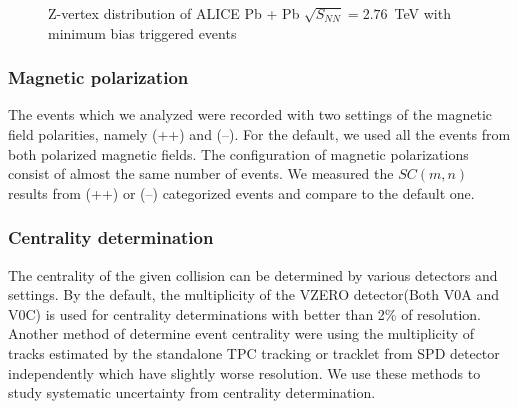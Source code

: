  	\begin{figure}[h]
		\begin{center}
        \caption{Z-vertex distribution of ALICE Pb + Pb $\sqrt{S_{NN}} = 2.76$~TeV with minimum bias triggered events }
        \label{fig:zvtx}
        \end{center}   
     \end{figure}


	
\subsubsection{Magnetic polarization}
	The events which we analyzed were recorded with two settings of the magnetic field polarities, namely (++) and  (--). For the default, we used all the events from both polarized magnetic fields. The configuration of magnetic polarizations consist of almost the same number of events. We measured the $SC(m,n)$ results from (++) or (--) categorized events and compare to the default one.
	
\subsubsection{Centrality determination}
	The centrality of the given collision can be determined by various detectors and settings. By the default, the multiplicity of the VZERO detector(Both V0A and V0C) is used for centrality determinations with better than 2\% of resolution. Another method of determine event centrality were using the multiplicity of tracks estimated by the standalone TPC tracking or tracklet from SPD detector independently which have slightly worse resolution. We use these methods to study systematic uncertainty from centrality determination.
	
